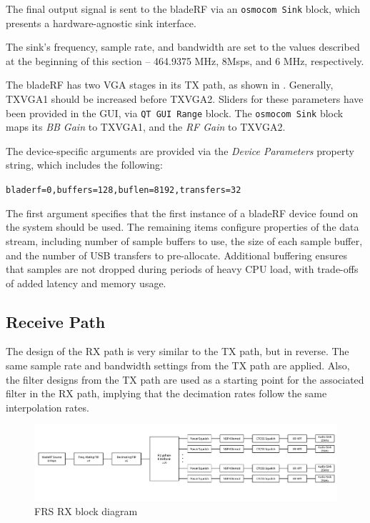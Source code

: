 The final output signal is sent to the bladeRF via an \texttt{osmocom Sink}
block, which presents a hardware-agnostic sink interface. 

The sink's frequency, sample rate, and bandwidth are set to the values
described at the beginning of this section -- 464.9375 MHz, 8Msps, and 6 MHz,
respectively.

The bladeRF has two \ac{VGA} stages in its \ac{TX} path, as shown in
\cite{LMS6002D_DATASHEET}. Generally, TXVGA1 should be increased before
TXVGA2. Sliders for these parameters have been provided in the \ac{GUI}, via
\texttt{QT GUI Range} block. The \texttt{osmocom Sink} block maps its
\textit{BB Gain} to TXVGA1, and the \textit{RF Gain} to TXVGA2.

The device-specific arguments are provided via the \textit{Device Parameters}
property string, which includes the following:

\begin{center}
  \texttt{bladerf=0,buffers=128,buflen=8192,transfers=32}
\end{center}

The first argument specifies that the first instance of a bladeRF device found
on the system should be used. The remaining items configure properties of the
data stream, including number of sample buffers to use, the size of each sample
buffer, and the number of USB transfers to pre-allocate. Additional buffering
ensures that samples are not dropped during periods of heavy CPU load, with
trade-offs of added latency and memory usage.

\newpage
\subsection{Receive Path}

The design of the \ac{RX} path is very similar to the \ac{TX} path, but in
reverse.  The same sample rate and bandwidth settings from the \ac{TX} path are applied.
Also, the filter designs from the \ac{TX} path are used as a starting point for the
associated filter in the \ac{RX} path, implying that the decimation rates follow
the same interpolation rates.

\begin{figure}[h]
  \centering
  \includegraphics[width=6.5in]{images/frs/bladeRF_FRS_RX_block_diagram.pdf}
  \caption{FRS RX block diagram}
  \label{fig:frs_rx_block_diagram}
\end{figure}

